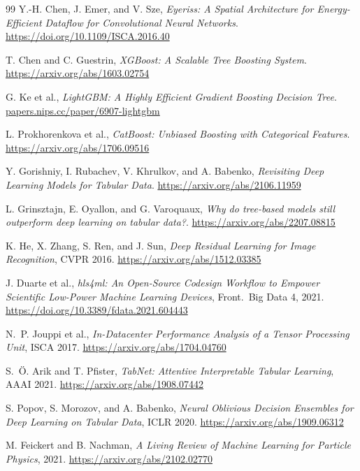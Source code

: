 \documentclass[a4paper,11pt]{article}
\begin{document}
\begin{thebibliography}{99}
Y.-H. Chen, J. Emer, and V. Sze, \emph{Eyeriss: A Spatial Architecture for
Energy-Efficient Dataflow for Convolutional Neural Networks}.\newline
\url{https://doi.org/10.1109/ISCA.2016.40}

T. Chen and C. Guestrin, \emph{XGBoost: A Scalable Tree Boosting System}.\newline
\url{https://arxiv.org/abs/1603.02754}

G. Ke et al., \emph{LightGBM: A Highly Efficient Gradient Boosting Decision
Tree}.\newline
\href{https://papers.nips.cc/paper/6907-lightgbm-a-highly-efficient-gradient-boosting-decision-tree}{papers.nips.cc/paper/6907-lightgbm}

L. Prokhorenkova et al., \emph{CatBoost: Unbiased Boosting with Categorical
Features}.\newline
\url{https://arxiv.org/abs/1706.09516}

Y. Gorishniy, I. Rubachev, V. Khrulkov, and A. Babenko, \emph{Revisiting Deep
Learning Models for Tabular Data}.\newline
\url{https://arxiv.org/abs/2106.11959}

L. Grinsztajn, E. Oyallon, and G. Varoquaux, \emph{Why do tree-based models
still outperform deep learning on tabular data?}.\newline
\url{https://arxiv.org/abs/2207.08815}

K. He, X. Zhang, S. Ren, and J. Sun, \emph{Deep Residual Learning for Image
Recognition}, CVPR 2016.\newline
\url{https://arxiv.org/abs/1512.03385}

J. Duarte et al., \emph{hls4ml: An Open-Source Codesign Workflow to Empower
Scientific Low-Power Machine Learning Devices}, Front.\ Big Data 4, 2021.\newline
\url{https://doi.org/10.3389/fdata.2021.604443}

N.~P. Jouppi et al., \emph{In-Datacenter Performance Analysis of a Tensor
Processing Unit}, ISCA 2017.\newline
\url{https://arxiv.org/abs/1704.04760}

S.~\"{O}. Arik and T. Pfister, \emph{TabNet: Attentive Interpretable Tabular
Learning}, AAAI 2021.\newline
\url{https://arxiv.org/abs/1908.07442}

S. Popov, S. Morozov, and A. Babenko, \emph{Neural Oblivious Decision Ensembles
for Deep Learning on Tabular Data}, ICLR 2020.\newline
\url{https://arxiv.org/abs/1909.06312}

M. Feickert and B. Nachman, \emph{A Living Review of Machine Learning for
Particle Physics}, 2021.\newline
\url{https://arxiv.org/abs/2102.02770}

\end{thebibliography}
\end{document}
